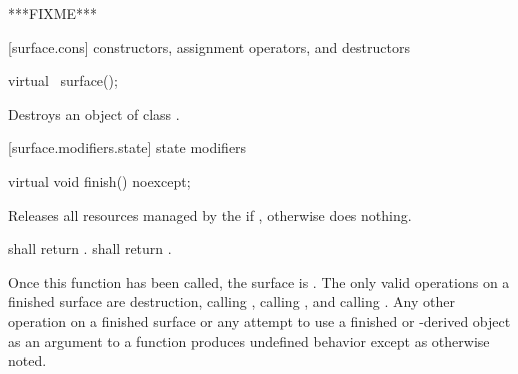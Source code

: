 \pnum
***FIXME***



 [surface.cons] { constructors, assignment operators, and destructors}

\begin{itemdecl}
virtual ~surface();
\end{itemdecl}
\begin{itemdescr}
\pnum
\effects
Destroys an object of class .
\end{itemdescr}

 [surface.modifiers.state] { state modifiers}

\begin{itemdecl}
virtual void finish() noexcept;
\end{itemdecl}
\begin{itemdescr}
\pnum
\effects
Releases all resources managed by the  if , otherwise does nothing.

\pnum
\postconditions
{} shall return .  shall return .

\pnum
\remarks
Once this function has been called, the surface is . The only valid operations on a finished surface are destruction, calling , calling , and calling . Any other operation on a finished surface or any attempt to use a finished  or -derived object as an argument to a function produces undefined behavior except as otherwise noted.
\end{itemdescr}

